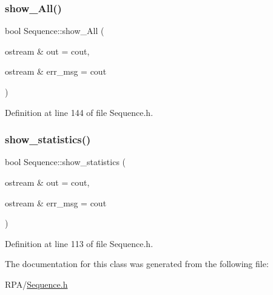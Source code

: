 \subsubsection{\texorpdfstring{show\+\_\+\+All()}{show\_All()}}
{\footnotesize\ttfamily bool Sequence\+::show\+\_\+\+All (\begin{DoxyParamCaption}\item[{ostream \&}]{out = {\ttfamily cout},  }\item[{ostream \&}]{err\+\_\+msg = {\ttfamily cout} }\end{DoxyParamCaption})}



Definition at line 144 of file Sequence.\+h.

\mbox{\label{class_sequence_adfd0c2b8558f68f764a7690ed9ad4adc}} 
\subsubsection{\texorpdfstring{show\+\_\+statistics()}{show\_statistics()}}
{\footnotesize\ttfamily bool Sequence\+::show\+\_\+statistics (\begin{DoxyParamCaption}\item[{ostream \&}]{out = {\ttfamily cout},  }\item[{ostream \&}]{err\+\_\+msg = {\ttfamily cout} }\end{DoxyParamCaption})}



Definition at line 113 of file Sequence.\+h.



The documentation for this class was generated from the following file\+:\begin{DoxyCompactItemize}
\item 
R\+P\+A/\mbox{\hyperlink{_sequence_8h}{Sequence.\+h}}\end{DoxyCompactItemize}
